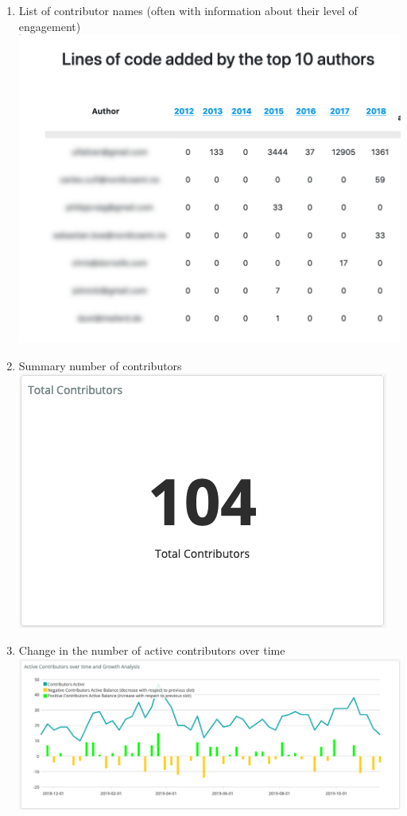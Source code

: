 \begin{enumerate}
\def\labelenumi{\arabic{enumi}.}
\item
  List of contributor names (often with information about their level of
  engagement)
  \includegraphics{images/contributors_top-contributor-info.png}
\item
  Summary number of contributors
  \includegraphics{images/contributors_summary-contributor-number.png}
\item
  Change in the number of active contributors over time
  \includegraphics{images/contributors_growth.png}

\end{enumerate}

